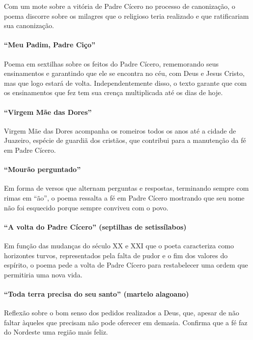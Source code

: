 Com um mote sobre a vitória de Padre Cícero no processo de canonização,
o poema discorre sobre os milagres que o religioso teria realizado e
que ratificariam sua canonização.

\paragraph{``Meu Padim, Padre Ciço''}

Poema em sextilhas sobre os feitos do Padre Cícero, rememorando seus
ensinamentos e garantindo que ele se encontra no céu, com Deus e Jesus
Cristo, mas que logo estará de volta. Independentemente disso, o texto
garante que com os ensinamentos que fez tem sua crença multiplicada até
os dias de hoje.

\paragraph{``Virgem Mãe das Dores''}

Virgem Mãe das Dores acompanha os romeiros todos os anos até a cidade de
Juazeiro, espécie de guardiã dos cristãos, que contribui para a manutenção da
fé em Padre Cícero.

\paragraph{``Mourão perguntado''}

Em forma de versos que alternam perguntas e respostas, terminando sempre
com rimas em ``ão'', o poema
ressalta a fé em Padre Cícero mostrando que seu nome não foi esquecido
porque sempre conviveu com o povo.

\paragraph{``A volta do Padre Cícero'' (septilhas de setissílabos) }

Em função das mudanças do século XX e XXI que o poeta caracteriza como
horizontes turvos, representados pela falta de pudor e o fim dos
valores do espírito, o poema pede a volta de Padre Cícero para
restabelecer uma ordem que permitiria uma nova vida.

\paragraph{``Toda terra precisa do seu santo'' (martelo alagoano)}

Reflexão sobre o bom senso dos pedidos realizados a Deus, que, 
apesar de não faltar àqueles que precisam não pode oferecer em demasia.
Confirma que a fé faz do Nordeste uma região mais feliz.

